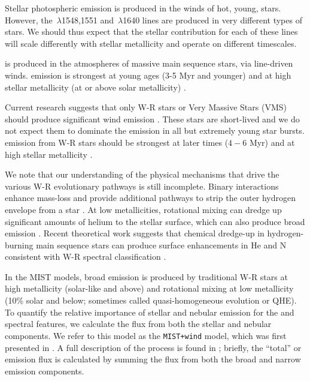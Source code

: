 \documentclass[preprint2]{aastex62}
\newcommand{\heii}{\ion{He}{2}}
\newcommand{\civ}{\ion{C}{4}}
\newcommand{\Myr}{$\,$Myr\xspace}
\begin{document}
Stellar photospheric emission is produced in the winds of hot, young, stars. However, the \civ$\,\lambda$1548,1551 and \heii$\,\lambda$1640 lines are produced in very different types of stars. We should thus expect that the stellar contribution for each of these lines will scale differently with stellar metallicity and operate on different timescales.

\civ{} is produced in the atmospheres of massive main sequence stars, via line-driven winds. \civ{} emission is strongest at young ages (3-5\,\Myr and younger) and at high stellar metallicity (at or above solar metallicity) \citep{Walborn+1987, Pauldrach+1990, Leitherer+1995, Walborn+2002}.

Current research suggests that only W-R stars or Very Massive Stars (VMS) should produce significant \heii{} wind emission \citep[e.g.,][]{Crowther+2016, Leitherer+2018}. These stars are short-lived and we do not expect them to dominate the \heii{} emission in all but extremely young star bursts. \heii{} emission from W-R stars should be strongest at later times ($4-6\,$\Myr) and at high stellar metallicity \citep[e.g.,][]{Schaerer+1998, Vink+2005}. 

We note that our understanding of the physical mechanisms that drive the various W-R evolutionary pathways is still incomplete. Binary interactions enhance mass-loss and provide additional pathways to strip the outer hydrogen envelope from a star \citep[e.g.,][]{Eldridge+2017}. At low metallicities, rotational mixing can dredge up significant amounts of helium to the stellar surface, which can also produce broad \heii{} emission \citep[e.g., ][]{Yoon+2005, Cantiello+2007, Eldridge+2011, Choi+2017, Eldridge+2017}. Recent theoretical work suggests that chemical dredge-up in hydrogen-burning main sequence stars can produce surface enhancements in He and N consistent with W-R spectral classification \citep{Roy+2019}.

In the MIST models, broad  emission is produced by traditional W-R stars at high metallicity (solar-like and above) and rotational mixing at low metallicity (10\% solar and below; sometimes called quasi-homogeneous evolution or QHE). To quantify the relative importance of stellar and nebular emission for the \civ{} and \heii{} spectral features, we calculate the flux from both the stellar and nebular components. We refer to this model as the {\tt MIST+wind} model, which was first presented in . A full description of the process is found in ; briefly, the ``total'' \civ{} or \heii{} emission flux is calculated by summing the flux from both the broad and narrow emission components.
\end{document}
